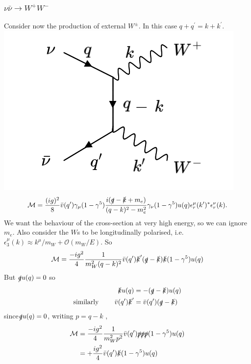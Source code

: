 \subsubsection{$\nu \bar{\nu} \to W^+ W^-$}
%
Consider now the production of external $W^\pm$. In this case $q + q^\prime = k + k^\prime$. 
\newline
%
  \includegraphics[width=0.4\linewidth]{figs/18a.png}
%
\begin{equation}
\mathcal{M} = \frac{(ig)^2}{8} \bar{v}(q^\prime) \gamma_\mu(1-\gamma^5)\frac{i(\slashed{q}-\slashed{k}+m_e)}{(q-k)^2 -m_e^2}\gamma_\nu(1-\gamma^5)u(q)\epsilon_r^\mu(k^\prime)^* \epsilon_r^\nu(k).
\end{equation}
We want the behaviour of the cross-section at very high energy, so we can ignore $m_e$. Also consider the $W$s to be longitudinally polarised, i.e. $\epsilon_3^\mu(k) \approx k^\mu/m_W + \mathcal{O}(m_W/E)$. So
\begin{equation}
\mathcal{M} = \frac{-ig^2}{4}\frac{1}{m_W^2(q-k)^2}\bar{v}(q^\prime)\slashed{k}^\prime(\slashed{q}-\slashed{k})\slashed{k}(1-\gamma^5)u(q)
\end{equation}
But $\slashed{q}u(q)=0$ so 
\begin{equation}
\begin{split}
\slashed{k}u(q) &= - (\slashed{q}-\slashed{k})u(q) \\
\text{similarly } \qquad \bar{v}(q^\prime)\slashed{k}^\prime &= \bar{v}(q^\prime)(\slashed{q}-\slashed{k})
\end{split}
\end{equation}
since$\slashed{q}u(q)=0$, writing $p = q -k$ ,
\begin{equation}
\begin{split}
\mathcal{M} &= \frac{-ig^2}{4}\frac{1}{m_W^2p^2}\bar{v}(q^\prime)\slashed{p}\slashed{p}\slashed{p}(1-\gamma^5)u(q) \\
&= +\frac{ig^2}{4}\bar{v}(q^\prime)\slashed{k}(1-\gamma^5)u(q)
\end{split}
\end{equation}
